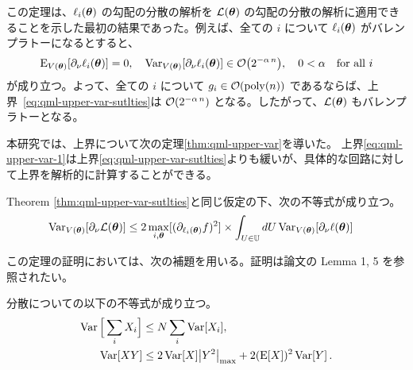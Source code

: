 この定理は、$\ell_i(\boldsymbol{\theta})$ の勾配の分散の解析を $\mathcal{L}(\boldsymbol{\theta})$ の勾配の分散の解析に適用できることを示した最初の結果であった。例えば、全ての $i$ について $\ell_{i}(\boldsymbol{\theta})$ がバレンプラトーになるとすると、
\begin{align}
    \E_{V(\bs{\th})}[\pd_\nu\ell_i(\bs{\th})] = 0, \quad
    \Var_{V(\bs{\th})}[\pd_\nu\ell_i(\bs{\th})] \in \order{2^{-\alpha\,n}},\quad 0<\alpha \quad \text{for all $i$}
\end{align}
が成り立つ。よって、全ての $i$ について $g_{i} \in \order{\poly(n)}$ であるならば、上界~\eqref{eq:qml-upper-var-sutlties}は $\order{2^{-\alpha\,n}}$ となる。したがって、$\mathcal{L}(\boldsymbol{\theta})$ もバレンプラトーとなる。

本研究では、上界について次の定理\ref{thm:qml-upper-var}を導いた。
上界\eqref{eq:qml-upper-var-1}は上界\eqref{eq:qml-upper-var-sutlties}よりも緩いが、具体的な回路に対して上界を解析的に計算することができる。
\begin{screen}
    \begin{theorem}\label{thm:qml-upper-var}
        Theorem \ref{thm:qml-upper-var-sutlties}と同じ仮定の下、次の不等式が成り立つ。
        \begin{align}\label{eq:qml-upper-var-1}
            \operatorname{Var}_{V(\boldsymbol{\theta})}[\partial_\nu \mathcal{L}(\boldsymbol{\theta})]
            &\leq
            2\max_{i,\boldsymbol{\theta}} [(\partial_{\ell_i(\boldsymbol{\theta})}f)^2]
            \times
            \int_{U\in\mathbb{U}} dU \operatorname{Var}_{V(\boldsymbol{\theta})}[\partial_\nu \ell(\boldsymbol{\theta})]
        \end{align}
    \end{theorem}
\end{screen}

この定理の証明においては、次の補題を用いる。証明は論文\cite{thanasilp2022exponential}の Lemma 1, 5 を参照されたい。
\begin{screen}
    \begin{lemma}\label{lem:variance-inequality}
        分散についての以下の不等式が成り立つ。
        \begin{align}
            \operatorname{Var}\Big[\sum_i X_i\Big] &\leq N\sum_i\operatorname{Var}[X_i],\label{eq:sum-variance}\\
            \operatorname{Var}[XY] &\leq 2\operatorname{Var}[X]\abs{Y^2}_{\max} + 2(\operatorname{E}[X])^2\operatorname{Var}[Y]\,.\label{eq:prod-variance}
        \end{align}
    \end{lemma}
\end{screen}

